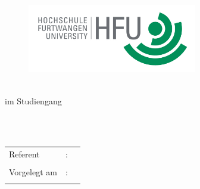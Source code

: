 \begin{titlepage}
\pagestyle{empty}

\begin{flushright}
\begin{figure}[ht]
\flushright
\includegraphics[height=3cm]{content/pictures/hfu.jpg}
\end{figure}
\end{flushright}

\begin{center}
{\fontsize{18}{22} \selectfont \docArtDerArbeit}\\[5mm]
{\fontsize{18}{22} \selectfont im Studiengang} \\[5mm]
{\fontsize{18}{22} \selectfont \docStudiengang}\\
\vspace{1cm}
\begin{onehalfspace}
{\fontsize{22}{26} \selectfont \textbf{\docTitle}}\\[5mm]
{\fontsize{18}{22} \selectfont \docUntertitle}


\end{onehalfspace}
\end{center}

\vfill
\begin{center}
\begin{tabular}{lcl}
Referent  		&:& \docErsterReferent 	\\ \\
Vorgelegt am 	&:& \docAbgabedatum 	\\ \\
\end{tabular}
\end{center}
\end{titlepage}